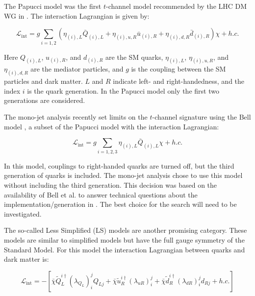 The Papucci model \cite{Papucci:2014iwa} was the first $t$-channel model recommended by the LHC DM WG in \cite{Abercrombie:2015wmb}. The interaction Lagrangian is given by:

\begin{equation}
\mathcal{L}_\text{int} = g \sum_{i=1,2} \left( \eta_{(i),L} \bar{Q}_{(i),L} + \eta_{(i),u,R} \bar{u}_{(i),R} + \eta_{(i),d,R} \bar{d}_{(i),R} \right) \chi + h.c.
\end{equation}

\noindent Here $Q_{(i),L}$, $u_{(i),R}$, and $d_{(i),R}$ are the SM quarks, $\eta_{(i),L}$, $\eta_{(i),u,R}$, and $\eta_{(i),d,R}$ are the mediator particles, and $g$ is the coupling between the SM particles and dark matter. $L$ and $R$ indicate left- and right-handedness, and the index $i$ is the quark generation. In the Papucci model only the first two generations are considered. 

The mono-jet analysis recently set limits on the $t$-channel signature using the Bell model \cite{Bell:2012rg}, a subset of the Papucci model with the interaction Lagrangian:

\begin{equation}
\mathcal{L}_\text{int} = g \sum_{i=1,2,3} \eta_{(i),L} \bar{Q}_{(i),L} \chi + h.c.
\end{equation}

\noindent In this model, couplings to right-handed quarks are turned off, but the third generation of quarks is included. The mono-jet analysis chose to use this model without including the third generation. This decision was based on the availability of Bell et al.\xspace to answer technical questions about the implementation/generation in \madgraph. The best choice for the \monoZ search will need to be investigated.

The so-called Less Simplified (LS) models \cite{Ko:2016zxg} are another promising category. These models are similar to simplified models but have the full gauge symmetry of the Standard Model. For this model the interaction Lagrangian between quarks and dark matter is:

\begin{equation}
\mathcal{L}_\text{int} = - \left[ \bar{\chi} \tilde{Q}_L^{i\dagger}(\lambda_{Q_L})_i^j Q_{Lj} + \bar{\chi} \tilde{u}_R^{i\dagger} (\lambda_{uR})_i^j + \bar{\chi} \tilde{d}_R^{i\dagger} (\lambda_{dR})_i^j d_{Rj} + h.c. \right]
\end{equation}


